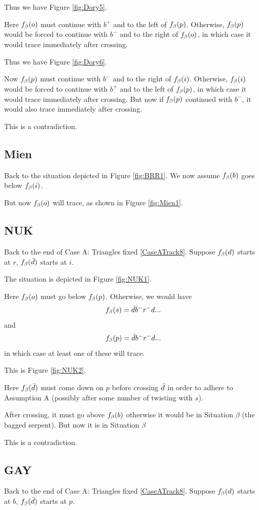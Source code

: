 Thus we have Figure \ref{fig:Dory5}.

Here $f_\beta(o)$ must continue with $b^+$ and to the left of $f_\beta(p)$. Otherwise, $f_\beta(p)$ would be forced to continue with $b^-$ and to the right of $f_\beta(o)$, in which case it would trace immediately after crossing.

Thus we have Figure \ref{fig:Dory6}.

Now $f_\beta(p)$ must continue with $b^-$ and to the right of $f_\beta(i)$. Otherwise, $f_\beta(i)$ would be forced to continue with $b^+$ and to the left of $f_\beta(p)$, in which case it would trace immediately after crossing. But now if $f_\beta(p)$ continued with $b^-$, it would also trace immediately after crossing.

This is a contradiction.

\subsection{Mien}\label{Mien}
Back to the situation depicted in Figure \ref{fig:BRR1}. We now assume $f_\beta(b)$ goes below $f_\beta(i)$.

But now $f_\beta(o)$ will trace, as shown in Figure \ref{fig:Mien1}.

\subsection{NUK}\label{NUK}
Back to the end of Case A: Triangles fixed \ref{CaseATrack8}. Suppose $f_\beta(d)$ starts at $r$, $f_\beta(\bar{d})$ starts at $i$. 

The situation is depicted in Figure \ref{fig:NUK1}.

Here $f_\beta(o)$ must go below $f_\beta(p)$. Otherwise, we would have
\[
f_\beta(s) = \bar{d} b^- r^- d...
\]
and
\[
f_\beta(p) = \bar{d} b^- r^- d...
\]
in which case at least one of these will trace.

This is Figure \ref{fig:NUK2}.

Here $f_\beta(\bar{d})$ must come down on $p$ before crossing $\bar{d}$ in order to adhere to Assumption A (possibly after some number of twisting with $s$).

After crossing, it must go above $f_\beta(b)$ otherwise it would be in Situation $\beta$ (the bagged serpent). But now it is in Situation $\beta$

This is a contradiction.

\subsection{GAY}\label{GAY}
Back to the end of Case A: Triangles fixed \ref{CaseATrack8}. Suppose $f_\beta(d)$ starts at $b$, $f_\beta(\bar{d})$ starts at $p$.

